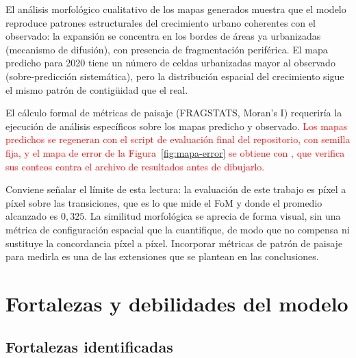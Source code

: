 El análisis morfológico cualitativo de los mapas generados muestra que el modelo reproduce patrones estructurales del crecimiento urbano coherentes con el observado: la expansión se concentra en los bordes de áreas ya urbanizadas (mecanismo de difusión), con presencia de fragmentación periférica. El mapa predicho para 2020 tiene un número de celdas urbanizadas mayor al observado (sobre-predicción sistemática), pero la distribución espacial del crecimiento sigue el mismo patrón de contigüidad que el real.

El cálculo formal de métricas de paisaje (FRAGSTATS, Moran's I) requeriría la ejecución de análisis específicos sobre los mapas predicho y observado. \textcolor{red}{Los mapas predichos se regeneran con el script de evaluación final del repositorio, con semilla fija, y el mapa de error de la Figura~\ref{fig:mapa-error} se obtiene con} \textcolor{red}{, que verifica sus conteos contra el archivo de resultados antes de dibujarlo.}

Conviene señalar el límite de esta lectura: la evaluación de este trabajo es píxel a píxel sobre las transiciones, que es lo que mide el FoM y donde el promedio alcanzado es $0{,}325$. La similitud morfológica se aprecia de forma visual, sin una métrica de configuración espacial que la cuantifique, de modo que no compensa ni sustituye la concordancia píxel a píxel. Incorporar métricas de patrón de paisaje para medirla es una de las extensiones que se plantean en las conclusiones.

\section{Fortalezas y debilidades del modelo}

\subsection{Fortalezas identificadas}

